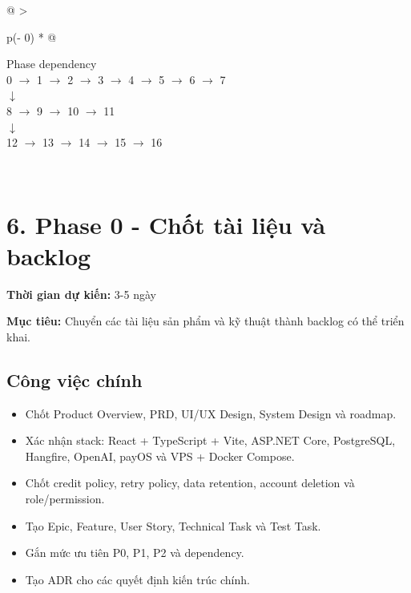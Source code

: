 \documentclass[
  11pt,
  a4paper,
]{article}
\begin{document}
\begin{longtable}[]{@{}
  >{\raggedright\arraybackslash}p{(\columnwidth - 0\tabcolsep) * }@{}}
\toprule\noalign{}
\begin{minipage}[b]{\linewidth}\raggedright
Phase dependency\\
0 \(\rightarrow\) 1 \(\rightarrow\) 2 \(\rightarrow\) 3 \(\rightarrow\) 4 \(\rightarrow\) 5 \(\rightarrow\) 6 \(\rightarrow\) 7\\
\(\downarrow\)\\
8 \(\rightarrow\) 9 \(\rightarrow\) 10 \(\rightarrow\) 11\\
\(\downarrow\)\\
12 \(\rightarrow\) 13 \(\rightarrow\) 14 \(\rightarrow\) 15 \(\rightarrow\) 16\strut
\end{minipage} \\
\midrule\noalign{}
\endhead
\bottomrule\noalign{}
\endlastfoot
\end{longtable}

\section{6. Phase 0 - Chốt tài liệu và
backlog}\label{phase-0---chux1ed1t-tuxe0i-liux1ec7u-vuxe0-backlog}

\textbf{Thời gian dự kiến:} 3-5 ngày

\textbf{Mục tiêu:} Chuyển các tài liệu sản phẩm và kỹ thuật thành
backlog có thể triển khai.

\subsection{Công việc chính}\label{cuxf4ng-viux1ec7c-chuxednh}

\begin{itemize}
\item
  Chốt Product Overview, PRD, UI/UX Design, System Design và roadmap.
\item
  Xác nhận stack: React + TypeScript + Vite, ASP.NET Core, PostgreSQL,
  Hangfire, OpenAI, payOS và VPS + Docker Compose.
\item
  Chốt credit policy, retry policy, data retention, account deletion và
  role/permission.
\item
  Tạo Epic, Feature, User Story, Technical Task và Test Task.
\item
  Gắn mức ưu tiên P0, P1, P2 và dependency.
\item
  Tạo ADR cho các quyết định kiến trúc chính.
\end{itemize}
\end{document}
